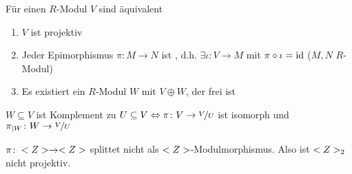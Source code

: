 \begin{proposition}
	Für einen $R$-Modul $V$ sind äquivalent
	\begin{enumerate}
		\item $V$ ist projektiv
		\item Jeder Epimorphismus $\pi\colon M \to N$ ist , d.h. $\exists \iota \colon V \to M$ mit $\pi \circ \iota = \operatorname{id}$ ($M,N$ $R$-Modul)
		\item Es existiert ein $R$-Modul $W$ mit $V \oplus W$, der frei ist
	\end{enumerate}
\end{proposition}
\begin{remark}
	$W \subseteq V$ ist Komplement zu $U \subseteq V \Leftrightarrow \pi \colon V \to \lnkset{V}{U}$ ist isomorph und $\pi_{\mid W}\colon W \to \lnkset{V}{U}$
\end{remark}
\begin{example}
	$\pi \colon <Z> \to <Z>$ splittet nicht als $<Z>$-Modulmorphismus. Also ist $<Z>_2$ nicht projektiv.
\end{example}
